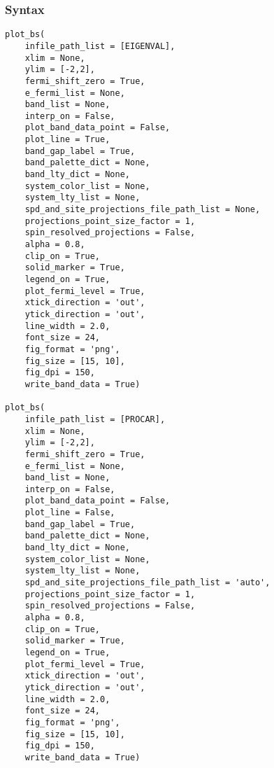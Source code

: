 \documentclass[12pt]{book}
\begin{document}
\subsubsection{Syntax}
\begin{lstlisting}
plot_bs(
    infile_path_list = [EIGENVAL],
    xlim = None,
    ylim = [-2,2],
    fermi_shift_zero = True,
    e_fermi_list = None,
    band_list = None,
    interp_on = False,
    plot_band_data_point = False,
    plot_line = True,
    band_gap_label = True,
    band_palette_dict = None,
    band_lty_dict = None,
    system_color_list = None,
    system_lty_list = None,
    spd_and_site_projections_file_path_list = None,
    projections_point_size_factor = 1,
    spin_resolved_projections = False,
    alpha = 0.8,
    clip_on = True,
    solid_marker = True,
    legend_on = True,
    plot_fermi_level = True,
    xtick_direction = 'out',
    ytick_direction = 'out',
    line_width = 2.0,
    font_size = 24,
    fig_format = 'png',
    fig_size = [15, 10],
    fig_dpi = 150,
    write_band_data = True)

plot_bs(
    infile_path_list = [PROCAR],
    xlim = None,
    ylim = [-2,2],
    fermi_shift_zero = True,
    e_fermi_list = None,
    band_list = None,
    interp_on = False,
    plot_band_data_point = False,
    plot_line = False,
    band_gap_label = True,
    band_palette_dict = None,
    band_lty_dict = None,
    system_color_list = None,
    system_lty_list = None,
    spd_and_site_projections_file_path_list = 'auto',
    projections_point_size_factor = 1,
    spin_resolved_projections = False,
    alpha = 0.8,
    clip_on = True,
    solid_marker = True,
    legend_on = True,
    plot_fermi_level = True,
    xtick_direction = 'out',
    ytick_direction = 'out',
    line_width = 2.0,
    font_size = 24,
    fig_format = 'png',
    fig_size = [15, 10],
    fig_dpi = 150,
    write_band_data = True)
\end{lstlisting}
\end{document}
